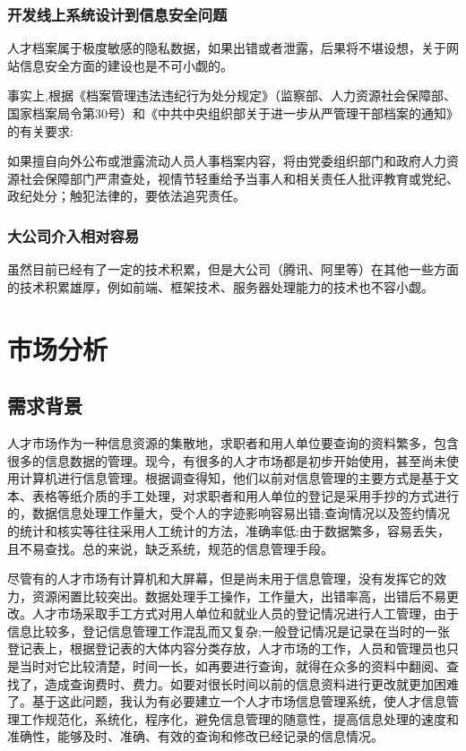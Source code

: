 \documentclass[UTF8]{ctexart}
\begin{document}
\subsubsection{开发线上系统设计到信息安全问题}
人才档案属于极度敏感的隐私数据，如果出错或者泄露，后果将不堪设想，关于网站信息安全方面的建设也是不可小觑的。

事实上,根据《档案管理违法违纪行为处分规定》（监察部、人力资源社会保障部、国家档案局令第30号）和《中共中央组织部关于进一步从严管理干部档案的通知》的有关要求:

如果擅自向外公布或泄露流动人员人事档案内容，将由党委组织部门和政府人力资源社会保障部门严肃查处，视情节轻重给予当事人和相关责任人批评教育或党纪、政纪处分；触犯法律的，要依法追究责任。
\subsubsection{大公司介入相对容易}
虽然目前已经有了一定的技术积累，但是大公司（腾讯、阿里等）在其他一些方面的技术积累雄厚，例如前端、框架技术、服务器处理能力的技术也不容小觑。
\section{市场分析}
\subsection{需求背景}
人才市场作为一种信息资源的集散地，求职者和用人单位要查询的资料繁多，包含很多的信息数据的管理。现今，有很多的人才市场都是初步开始使用，甚至尚未使用计算机进行信息管理。根据调查得知，他们以前对信息管理的主要方式是基于文本、表格等纸介质的手工处理，对求职者和用人单位的登记是采用手抄的方式进行的，数据信息处理工作量大，受个人的字迹影响容易出错;查询情况以及签约情况的统计和核实等往往采用人工统计的方法，准确率低;由于数据繁多，容易丢失，且不易查找。总的来说，缺乏系统，规范的信息管理手段。


尽管有的人才市场有计算机和大屏幕，但是尚未用于信息管理，没有发挥它的效力，资源闲置比较突出。数据处理手工操作，工作量大，出错率高，出错后不易更改。人才市场采取手工方式对用人单位和就业人员的登记情况进行人工管理，由于信息比较多，登记信息管理工作混乱而又复杂;一般登记情况是记录在当时的一张登记表上，根据登记表的大体内容分类存放，人才市场的工作，人员和管理员也只是当时对它比较清楚，时间一长，如再要进行查询，就得在众多的资料中翻阅、查找了，造成查询费时、费力。如要对很长时间以前的信息资料进行更改就更加困难了。基于这此问题，我认为有必要建立一个人才市场信息管理系统，使人才信息管理工作规范化，系统化，程序化，避免信息管理的随意性，提高信息处理的速度和准确性，能够及时、准确、有效的查询和修改已经记录的信息情况。
\end{document}
